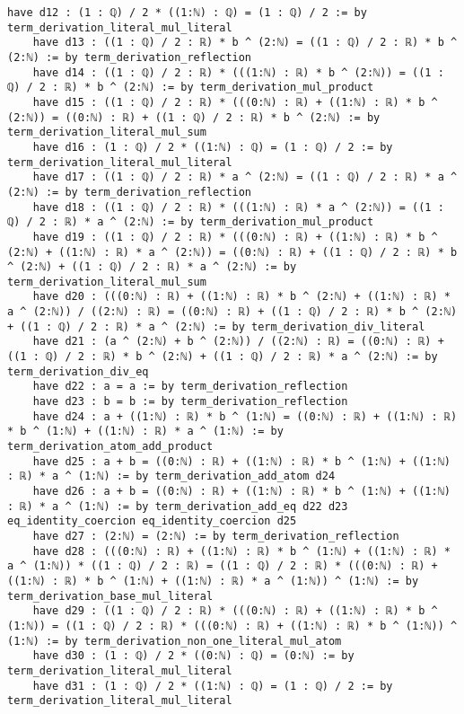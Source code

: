 \documentclass{article}
\begin{document}
\begin{tcolorbox}[colback=white!10, width=\linewidth]
\begin{lstlisting}[language=Lean4]
    have d12 : (1 : ℚ) / 2 * ((1:ℕ) : ℚ) = (1 : ℚ) / 2 := by term_derivation_literal_mul_literal
    have d13 : ((1 : ℚ) / 2 : ℝ) * b ^ (2:ℕ) = ((1 : ℚ) / 2 : ℝ) * b ^ (2:ℕ) := by term_derivation_reflection
    have d14 : ((1 : ℚ) / 2 : ℝ) * (((1:ℕ) : ℝ) * b ^ (2:ℕ)) = ((1 : ℚ) / 2 : ℝ) * b ^ (2:ℕ) := by term_derivation_mul_product
    have d15 : ((1 : ℚ) / 2 : ℝ) * (((0:ℕ) : ℝ) + ((1:ℕ) : ℝ) * b ^ (2:ℕ)) = ((0:ℕ) : ℝ) + ((1 : ℚ) / 2 : ℝ) * b ^ (2:ℕ) := by term_derivation_literal_mul_sum
    have d16 : (1 : ℚ) / 2 * ((1:ℕ) : ℚ) = (1 : ℚ) / 2 := by term_derivation_literal_mul_literal
    have d17 : ((1 : ℚ) / 2 : ℝ) * a ^ (2:ℕ) = ((1 : ℚ) / 2 : ℝ) * a ^ (2:ℕ) := by term_derivation_reflection
    have d18 : ((1 : ℚ) / 2 : ℝ) * (((1:ℕ) : ℝ) * a ^ (2:ℕ)) = ((1 : ℚ) / 2 : ℝ) * a ^ (2:ℕ) := by term_derivation_mul_product
    have d19 : ((1 : ℚ) / 2 : ℝ) * (((0:ℕ) : ℝ) + ((1:ℕ) : ℝ) * b ^ (2:ℕ) + ((1:ℕ) : ℝ) * a ^ (2:ℕ)) = ((0:ℕ) : ℝ) + ((1 : ℚ) / 2 : ℝ) * b ^ (2:ℕ) + ((1 : ℚ) / 2 : ℝ) * a ^ (2:ℕ) := by term_derivation_literal_mul_sum
    have d20 : (((0:ℕ) : ℝ) + ((1:ℕ) : ℝ) * b ^ (2:ℕ) + ((1:ℕ) : ℝ) * a ^ (2:ℕ)) / ((2:ℕ) : ℝ) = ((0:ℕ) : ℝ) + ((1 : ℚ) / 2 : ℝ) * b ^ (2:ℕ) + ((1 : ℚ) / 2 : ℝ) * a ^ (2:ℕ) := by term_derivation_div_literal
    have d21 : (a ^ (2:ℕ) + b ^ (2:ℕ)) / ((2:ℕ) : ℝ) = ((0:ℕ) : ℝ) + ((1 : ℚ) / 2 : ℝ) * b ^ (2:ℕ) + ((1 : ℚ) / 2 : ℝ) * a ^ (2:ℕ) := by term_derivation_div_eq
    have d22 : a = a := by term_derivation_reflection
    have d23 : b = b := by term_derivation_reflection
    have d24 : a + ((1:ℕ) : ℝ) * b ^ (1:ℕ) = ((0:ℕ) : ℝ) + ((1:ℕ) : ℝ) * b ^ (1:ℕ) + ((1:ℕ) : ℝ) * a ^ (1:ℕ) := by term_derivation_atom_add_product
    have d25 : a + b = ((0:ℕ) : ℝ) + ((1:ℕ) : ℝ) * b ^ (1:ℕ) + ((1:ℕ) : ℝ) * a ^ (1:ℕ) := by term_derivation_add_atom d24
    have d26 : a + b = ((0:ℕ) : ℝ) + ((1:ℕ) : ℝ) * b ^ (1:ℕ) + ((1:ℕ) : ℝ) * a ^ (1:ℕ) := by term_derivation_add_eq d22 d23 eq_identity_coercion eq_identity_coercion d25
    have d27 : (2:ℕ) = (2:ℕ) := by term_derivation_reflection
    have d28 : (((0:ℕ) : ℝ) + ((1:ℕ) : ℝ) * b ^ (1:ℕ) + ((1:ℕ) : ℝ) * a ^ (1:ℕ)) * ((1 : ℚ) / 2 : ℝ) = ((1 : ℚ) / 2 : ℝ) * (((0:ℕ) : ℝ) + ((1:ℕ) : ℝ) * b ^ (1:ℕ) + ((1:ℕ) : ℝ) * a ^ (1:ℕ)) ^ (1:ℕ) := by term_derivation_base_mul_literal
    have d29 : ((1 : ℚ) / 2 : ℝ) * (((0:ℕ) : ℝ) + ((1:ℕ) : ℝ) * b ^ (1:ℕ)) = ((1 : ℚ) / 2 : ℝ) * (((0:ℕ) : ℝ) + ((1:ℕ) : ℝ) * b ^ (1:ℕ)) ^ (1:ℕ) := by term_derivation_non_one_literal_mul_atom
    have d30 : (1 : ℚ) / 2 * ((0:ℕ) : ℚ) = (0:ℕ) := by term_derivation_literal_mul_literal
    have d31 : (1 : ℚ) / 2 * ((1:ℕ) : ℚ) = (1 : ℚ) / 2 := by term_derivation_literal_mul_literal

\end{lstlisting}
\end{tcolorbox}
\end{document}
